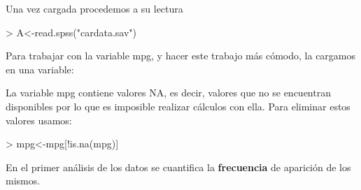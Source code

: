 \documentclass [a4paper] {article}
\begin{document}
\bigskip
Una vez cargada procedemos a su lectura
\begin{Schunk}
\begin{Sinput}
> A<-read.spss("cardata.sav")
\end{Sinput}
\end{Schunk}

\bigskip
Para trabajar con la variable mpg, y hacer este trabajo m\'as
c\'omodo, la cargamos en una variable:
\begin{Schunk}
\end{Schunk}

\bigskip
La variable mpg contiene valores NA, es decir, valores que no se encuentran disponibles 
por lo que es imposible realizar c\'alculos con ella. Para eliminar estos valores usamos:
\begin{Schunk}
\begin{Sinput}
> mpg<-mpg[!is.na(mpg)]
\end{Sinput}
\end{Schunk}

\bigskip
En el primer an\'alisis de los datos se cuantifica la \textbf{frecuencia}
de aparici\'on de los mismos. 
\end{document}
